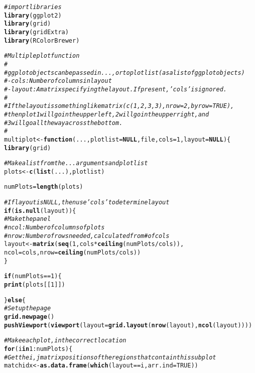 \documentclass[10pt]{olplainarticle}\usepackage[]{graphicx}\usepackage[]{color}
\makeatletter
\newcommand{\hlnum}[1]{\textcolor[rgb]{0.686,0.059,0.569}{#1}}%
\newcommand{\hlcom}[1]{\textcolor[rgb]{0.678,0.584,0.686}{\textit{#1}}}%
\newcommand{\hlopt}[1]{\textcolor[rgb]{0,0,0}{#1}}%
\newcommand{\hlstd}[1]{\textcolor[rgb]{0.345,0.345,0.345}{#1}}%
\newcommand{\hlkwa}[1]{\textcolor[rgb]{0.161,0.373,0.58}{\textbf{#1}}}%
\newcommand{\hlkwb}[1]{\textcolor[rgb]{0.69,0.353,0.396}{#1}}%
\newcommand{\hlkwc}[1]{\textcolor[rgb]{0.333,0.667,0.333}{#1}}%
\newcommand{\hlkwd}[1]{\textcolor[rgb]{0.737,0.353,0.396}{\textbf{#1}}}%
\newenvironment{kframe}{%
 \def\at@end@of@kframe{}%
 \ifinner\ifhmode%
  \def\at@end@of@kframe{\end{minipage}}%
  \begin{minipage}{\columnwidth}%
 \fi\fi%
 \def\FrameCommand##1{\hskip\@totalleftmargin \hskip-\fboxsep
 \colorbox{shadecolor}{##1}\hskip-\fboxsep
     \hskip-\linewidth \hskip-\@totalleftmargin \hskip\columnwidth}%
 \MakeFramed {\advance\hsize-\width
   \@totalleftmargin\z@ \linewidth\hsize
   \@setminipage}}%
 {\par\unskip\endMakeFramed%
 \at@end@of@kframe}
\newenvironment{knitrout}{}{} %
\makeatother
\begin{document}
\begin{appendices}
\begin{knitrout}
\begin{kframe}
\begin{alltt}
\hlcom{# import libraries}
\hlkwd{library}\hlstd{(ggplot2)}
\hlkwd{library}\hlstd{(grid)}
\hlkwd{library}\hlstd{(gridExtra)}
\hlkwd{library}\hlstd{(RColorBrewer)}


\hlcom{# Multiple plot function}
\hlcom{#}
\hlcom{# ggplot objects can be passed in ..., or to plotlist (as a list of ggplot objects)}
\hlcom{# - cols:   Number of columns in layout}
\hlcom{# - layout: A matrix specifying the layout. If present, 'cols' is ignored.}
\hlcom{#}
\hlcom{# If the layout is something like matrix(c(1,2,3,3), nrow=2, byrow=TRUE),}
\hlcom{# then plot 1 will go in the upper left, 2 will go in the upper right, and}
\hlcom{# 3 will go all the way across the bottom.}
\hlcom{#}
\hlstd{multiplot} \hlkwb{<-} \hlkwa{function}\hlstd{(}\hlkwc{...}\hlstd{,} \hlkwc{plotlist}\hlstd{=}\hlkwa{NULL}\hlstd{,} \hlkwc{file}\hlstd{,} \hlkwc{cols}\hlstd{=}\hlnum{1}\hlstd{,} \hlkwc{layout}\hlstd{=}\hlkwa{NULL}\hlstd{) \{}
  \hlkwd{library}\hlstd{(grid)}

  \hlcom{# Make a list from the ... arguments and plotlist}
  \hlstd{plots} \hlkwb{<-} \hlkwd{c}\hlstd{(}\hlkwd{list}\hlstd{(...), plotlist)}

  \hlstd{numPlots} \hlkwb{=} \hlkwd{length}\hlstd{(plots)}

  \hlcom{# If layout is NULL, then use 'cols' to determine layout}
  \hlkwa{if} \hlstd{(}\hlkwd{is.null}\hlstd{(layout)) \{}
    \hlcom{# Make the panel}
    \hlcom{# ncol: Number of columns of plots}
    \hlcom{# nrow: Number of rows needed, calculated from # of cols}
    \hlstd{layout} \hlkwb{<-} \hlkwd{matrix}\hlstd{(}\hlkwd{seq}\hlstd{(}\hlnum{1}\hlstd{, cols} \hlopt{*} \hlkwd{ceiling}\hlstd{(numPlots}\hlopt{/}\hlstd{cols)),}
                     \hlkwc{ncol} \hlstd{= cols,} \hlkwc{nrow} \hlstd{=} \hlkwd{ceiling}\hlstd{(numPlots}\hlopt{/}\hlstd{cols))}
  \hlstd{\}}

  \hlkwa{if} \hlstd{(numPlots}\hlopt{==}\hlnum{1}\hlstd{) \{}
    \hlkwd{print}\hlstd{(plots[[}\hlnum{1}\hlstd{]])}

  \hlstd{\}} \hlkwa{else} \hlstd{\{}
    \hlcom{# Set up the page}
    \hlkwd{grid.newpage}\hlstd{()}
    \hlkwd{pushViewport}\hlstd{(}\hlkwd{viewport}\hlstd{(}\hlkwc{layout} \hlstd{=} \hlkwd{grid.layout}\hlstd{(}\hlkwd{nrow}\hlstd{(layout),} \hlkwd{ncol}\hlstd{(layout))))}

    \hlcom{# Make each plot, in the correct location}
    \hlkwa{for} \hlstd{(i} \hlkwa{in} \hlnum{1}\hlopt{:}\hlstd{numPlots) \{}
      \hlcom{# Get the i,j matrix positions of the regions that contain this subplot}
      \hlstd{matchidx} \hlkwb{<-} \hlkwd{as.data.frame}\hlstd{(}\hlkwd{which}\hlstd{(layout} \hlopt{==} \hlstd{i,} \hlkwc{arr.ind} \hlstd{=} \hlnum{TRUE}\hlstd{))}


\end{alltt}
\end{kframe}
\end{knitrout}
\end{appendices}
\end{document}
